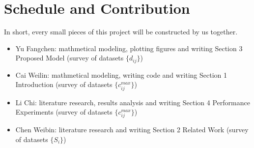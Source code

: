 \section{Schedule and Contribution}

In short, every small pieces of this project will be constructed by us together.
\begin{itemize}
    \item Yu Fangchen: mathmetical modeling, plotting figures and writing Section 3 Proposed Model (survey of datasets $\{d_{ij}\}$) 
    \item Cai Weilin: mathmetical modeling, writing code and writing Section 1 Introduction (survey of datasets $\{c_{ij}^{max}\}$) 
    \item Li Chi: literature research, results analysis and writing Section 4 Performance Experiments (survey of datasets $\{c_{ij}^{max}\}$) 
    \item Chen Weibin: literature research and writing Section 2 Related Work (survey of datasets $\{S_i\}$) 
\end{itemize}
